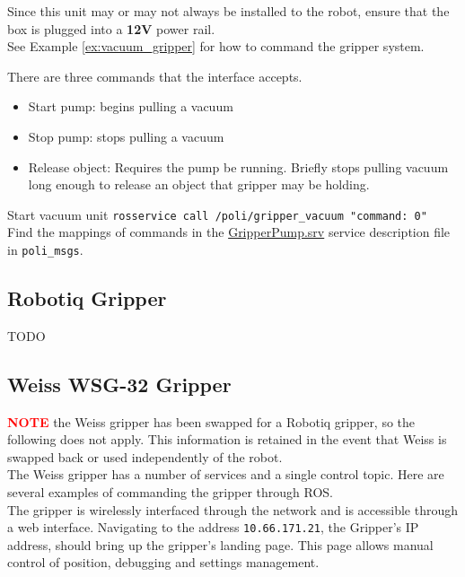 Since this unit may or may not always be installed to the robot, ensure that the box is plugged into a \textbf{12V} power rail. \\
See Example \ref{ex:vacuum_gripper} for how to command the gripper system.

There are three commands that the interface accepts. 
\begin{itemize}
\item Start pump: begins pulling a vacuum
\item Stop pump: stops pulling a vacuum
\item Release object: Requires the pump be running. Briefly stops pulling vacuum long enough to release an object that gripper may be holding.
\end{itemize}

\begin{example}{Start vacuum unit}
  \label{ex:vacuum_gripper}
    \texttt{rosservice call /poli/gripper\_vacuum "command: 0"} \\
    Find the mappings of commands in the \href{https://github.com/si-machines/poli2/blob/master/poli_msgs/srv/GripperPump.srv}{GripperPump.srv} service description file in \texttt{poli\_msgs}.
\end{example}

\subsection{Robotiq Gripper}
TODO

\subsection{Weiss WSG-32 Gripper}
\textcolor{red}{\textbf{NOTE}} the Weiss gripper has been swapped for a Robotiq gripper, so the following does not apply. 
This information is retained in the event that Weiss is swapped back or used independently of the robot. \\

The Weiss gripper has a number of services and a single control topic.
Here are several examples of commanding the gripper through ROS. \\

The gripper is wirelessly interfaced through the network and is accessible through a web interface. 
Navigating to the address \texttt{10.66.171.21}, the Gripper's IP address, should bring up the gripper's landing page. 
This page allows manual control of position, debugging and settings management.

